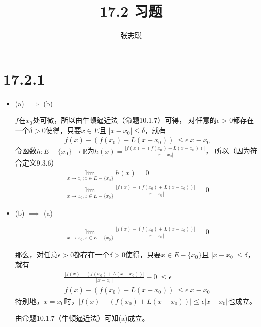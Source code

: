 \documentclass{article}
\begin{document}
\title{17.2 习题}
\author{张志聪}
\maketitle

\section*{17.2.1}

\begin{itemize}
  \item (a) $\implies$ (b)

        $f$在$x_0$处可微，所以由牛顿逼近法（命题10.1.7）可得，
        对任意的$\epsilon > 0$都存在一个$\delta > 0$使得，只要$x \in E$且
        $|x - x_0| \leq \delta$，就有
        \begin{align*}
          |f(x) - (f(x_0) + L(x - x_0))| \leq \epsilon|x - x_0|
        \end{align*}
        令函数$h: E - \{x_0\} \to \mathbb{R}$为$h(x) = \frac{|f(x) - (f(x_0) + L(x - x_0))|}{|x - x_0|}$，
        所以（因为符合定义9.3.6）
        \begin{align*}
          \lim\limits_{x \to x_0; x \in E - \{x_0\}} h(x) = 0 \\
          \lim\limits_{x \to x_0; x \in E - \{x_0\}} \frac{|f(x) - (f(x_0) + L(x - x_0))|}{|x - x_0|} = 0
        \end{align*}

  \item (b) $\implies$ (a)

        \begin{align*}
          \lim\limits_{x \to x_0; x \in E - \{x_0\}} \frac{|f(x) - (f(x_0) + L(x - x_0))|}{|x - x_0|} = 0
        \end{align*}

        那么，对任意$\epsilon > 0$都存在一个$\delta > 0$使得，只要$x \in E - \{x_0\}$且
        $|x - x_0| \leq \delta$，就有
        \begin{align*}
          \left|\frac{|f(x) - (f(x_0) + L(x - x_0))|}{|x - x_0|} - 0\right| \leq \epsilon \\
          |f(x) - (f(x_0) + L(x - x_0))| \leq \epsilon|x - x_0|
        \end{align*}
        特别地，$x = x_0$时，$|f(x) - (f(x_0) + L(x - x_0))| \leq \epsilon|x - x_0|$也成立。

        由命题10.1.7（牛顿逼近法）可知(a)成立。
\end{itemize}
\end{document}
